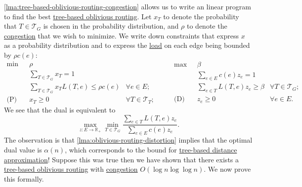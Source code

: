 \autoref{lma:tree-based-oblivious-routing-congestion} allows us to write an linear program to find the best \hyperref[not:tree-based-oblivious-routing]{tree-based oblivious routing}. Let \(x_T\) to denote the probability that \(T \in \mathcal{T} _G\) is chosen in the probability distribution, and \(\rho \) to denote the \hyperref[def:congestion-of-oblivious-routing]{congestion} that we wish to minimize. We write down constraints that express \(x\) as a probability distribution and to express the \hyperref[def:expected-load]{load} on each edge being bounded by \(\rho c(e)\):
\[
	\begin{aligned}
		\min~           & \rho                                                                                  \\
		                & \sum_{T \in \mathcal{T} _G} x_T = 1                                                   \\
		                & \sum_{T \in\mathcal{T} _G} x_T L(T, e) \leq \rho c(e) & \forall e \in E ;             \\
		\text{(P)}\quad & x_T \geq 0                                            & \forall T \in \mathcal{T} _T;
	\end{aligned}\qquad
	\begin{aligned}
		\max~           & \beta                                                                  \\
		                & \sum_{e \in E} c(e) z_e = 1                                            \\
		                & \sum_{e \in T} L(T, e) z_e \geq \beta & \forall T \in \mathcal{T} _G ; \\
		\text{(D)}\quad & z_e \geq 0                            & \forall e \in E.
	\end{aligned}
\]
We see that the dual is equivalent to
\begin{equation}\label{eq:tree-based-oblivious-routing-dual-LP-equivalent}
	\max _{z \colon E \to \mathbb{R} _+} \min _{T \in \mathcal{T} _G} \frac{\sum_{e \in T} L(T, e) z_e}{\sum_{e \in E} c(e) z_e}.
\end{equation}
The observation is that \autoref{lma:oblivious-routing-distortion} implies that the optimal dual value is \(\alpha (n)\), which corresponds to the bound for \hyperref[prb:tree-embedding]{tree-based distance approximation}! Suppose this was true then we have shown that there exists a \hyperref[not:tree-based-oblivious-routing]{tree-based oblivious routing} with \hyperref[def:congestion-of-oblivious-routing]{congestion} \(O(\log n \log \log n)\). We now prove this formally.

